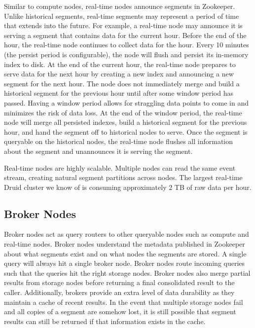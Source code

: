 \documentclass{vldb}
\begin{document}
Similar to compute nodes, real-time nodes announce segments in
Zookeeper. Unlike historical segments, real-time segments may
represent a period of time that extends into the future. For example,
a real-time node may announce it is serving a segment that contains
data for the current hour. Before the end of the hour, the real-time
node continues to collect data for the hour. Every 10 minutes (the
persist period is configurable), the node will flush and persist its
in-memory index to disk. At the end of the current hour, the real-time
node prepares to serve data for the next hour by creating a new index
and announcing a new segment for the next hour. The node does not
immediately merge and build a historical segment for the previous hour
until after some window period has passed. Having a window period
allows for straggling data points to come in and minimizes the risk of
data loss. At the end of the window period, the real-time node will
merge all persisted indexes, build a historical segment for the
previous hour, and hand the segment off to historical nodes to
serve. Once the segment is queryable on the historical nodes, the
real-time node flushes all information about the segment and
unannounces it is serving the segment.

Real-time nodes are highly scalable. Multiple nodes can read the same
event stream, creating natural segment partitions across nodes. The
largest real-time Druid cluster we know of is consuming approximately
2 TB of raw data per hour.

\subsection{Broker Nodes}
Broker nodes act as query routers to other queryable nodes such as
compute and real-time nodes. Broker nodes understand the metadata
published in Zookeeper about what segments exist and on what nodes the
segments are stored. A single query will always hit a single broker
node. Broker nodes route incoming queries such that the queries hit
the right storage nodes. Broker nodes also merge partial results from
storage nodes before returning a final consolidated result to the
caller.  Additionally, brokers provide an extra level of data
durability as they maintain a cache of recent results. In the event
that multiple storage nodes fail and all copies of a segment are
somehow lost, it is still possible that segment results can still be
returned if that information exists in the cache.
\end{document}
